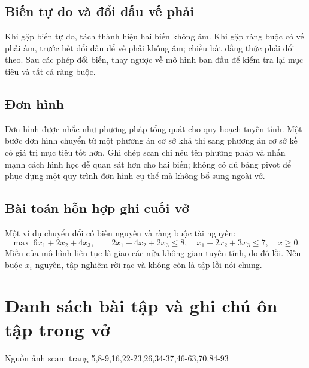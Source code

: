 \documentclass[11pt,a4paper]{article}
\newcommand{\src}[1]{\hfill{\footnotesize\color{gray}Nguồn ảnh scan: trang #1}}
\begin{document}
\subsection{Biến tự do và đổi dấu vế phải}
Khi gặp biến tự do, tách thành hiệu hai biến không âm. Khi gặp ràng buộc có vế phải âm, trước hết đổi dấu để vế phải không âm; chiều bất đẳng thức phải đổi theo. Sau các phép đổi biến, thay ngược về mô hình ban đầu để kiểm tra lại mục tiêu và tất cả ràng buộc.

\subsection{Đơn hình}
Đơn hình được nhắc như phương pháp tổng quát cho quy hoạch tuyến tính. Một bước đơn hình chuyển từ một phương án cơ sở khả thi sang phương án cơ sở kề có giá trị mục tiêu tốt hơn. Ghi chép scan chỉ nêu tên phương pháp và nhấn mạnh cách hình học dễ quan sát hơn cho hai biến; không có đủ bảng pivot để phục dựng một quy trình đơn hình cụ thể mà không bổ sung ngoài vở.

\subsection{Bài toán hỗn hợp ghi cuối vở}
Một ví dụ chuyển đổi có biến nguyên và ràng buộc tài nguyên:
\[
\max\ 6x_1+2x_2+4x_3,\qquad
2x_1+4x_2+2x_3\le8,\quad
x_1+2x_2+3x_3\le7,\quad x\ge0.
\]
Miền của mô hình liên tục là giao các nửa không gian tuyến tính, do đó lồi. Nếu buộc \(x_i\) nguyên, tập nghiệm rời rạc và không còn là tập lồi nói chung.

\section{Danh sách bài tập và ghi chú ôn tập trong vở}
\src{5,8-9,16,22-23,26,34-37,46-63,70,84-93}
\end{document}
